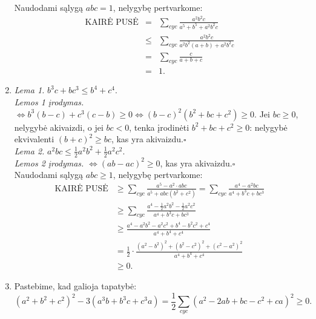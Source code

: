 \begin{enumerate}
Naudodami sąlygą $abc=1$, nelygybę pertvarkome:
\begin{eqnarray*} \mbox{KAIRĖ
PUSĖ}&=&\sum_{cyc}{\frac{a^2b^2c}{a^5+b^5+a^2b^2c}}\\
&\leq&\sum_{cyc}{\frac{a^2b^2c}{a^2b^2(a+b)+a^2b^2c}}\\
&=&\sum_{cyc}{\frac{c}{a+b+c}}\\ &=&1. \end{eqnarray*}
\item 
\textit{Lema 1.} $b^3c+bc^3\leq b^4+c^4$.\\ \noindent\textit{Lemos 1
įrodymas.} $\Leftrightarrow b^3(b-c)+c^3(c-b)\geq0 \Leftrightarrow
(b-c)^2(b^2+bc+c^2)\geq0$. Jei $bc\geq0$, nelygybė akivaizdi, o jei
$bc<0$, tenka įrodinėti $b^2+bc+c^2\geq0$: nelygybė ekvivalenti
$(b+c)^2\geq bc$, kas yra akivaizdu.\hfill{$\square$} \\
\textit{Lema 2.} $a^2bc\leq \frac{1}{2}a^2b^2+\frac{1}{2}a^2c^2$.\\
\noindent\textit{Lemos 2 įrodymas.} $\Leftrightarrow (ab-ac)^2\geq0$,
kas yra akivaizdu.\hfill{$\square$} \\ Naudodami sąlygą $abc\geq1$,
nelygybę pertvarkome: \begin{align*} \mbox{KAIRĖ PUSĖ}&\geq
\sum_{cyc}{\frac{a^5-a^2\cdot
abc}{a^5+abc(b^2+c^2)}}=\sum_{cyc}{\frac{a^4-a^2bc}{a^4+b^3c+bc^3}}\\
&\geq\sum_{cyc}{\frac{a^4-\frac{1}{2}a^2b^2-\frac{1}{2}a^2c^2}{a^4+b^3c+bc^3}}
\tag{Lema 2}\\
&\geq\frac{a^4-a^2b^2-a^2c^2+b^4-b^2c^2+c^4}{a^4+b^4+c^4} \tag{Lema
1}\\
&=\frac{1}{2}\cdot\frac{(a^2-b^2)^2+(b^2-c^2)^2+(c^2-a^2)^2}{a^4+b^4+c^4}\\
&\geq 0.\end{align*}
\item 
Pastebime, kad galioja tapatybė: $$
(a^2+b^2+c^2)^2-3(a^3b+b^3c+c^3a)=\frac{1}{2}\sum_{cyc}{(a^2-2ab+bc-c^2+ca)^2}\geq
0.$$
\end{enumerate} 
